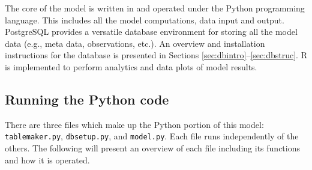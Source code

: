 The core of the model is written in and operated under the Python programming language. 
This includes all the model computations, data input and output.  
PostgreSQL provides a versatile database environment for storing all the model data (e.g., meta data, observations, etc.).  
An overview and installation instructions for the database is presented in Sections \ref{sec:dbintro}--\ref{sec:dbstruc}.  
R is implemented to perform analytics and data plots of model results.

\subsection{Running the Python code}
\label{sec:modelpy}
There are three files which make up the Python portion of this model: \texttt{table\textunderscore maker.py}, \texttt{db\textunderscore setup.py}, and \texttt{model.py}. 
Each file runs independently of the others.  
The following will present an overview of each file including its functions and how it is operated.

